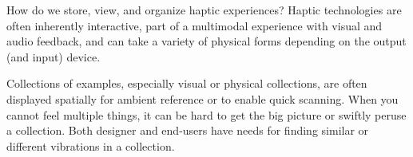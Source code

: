 

    How do we store, view, and organize haptic experiences?
    Haptic technologies are often inherently interactive, part of a multimodal experience with visual and audio feedback, and can take a variety of physical forms depending on the output (and input) device.

    
    Collections of examples, especially visual or physical collections, are often displayed spatially for ambient reference or to enable quick scanning.
    When you cannot feel multiple things, it can be hard to get the big picture or swiftly peruse a collection.
    Both designer and end-users have needs for finding similar or different vibrations in a collection. %


%
%
